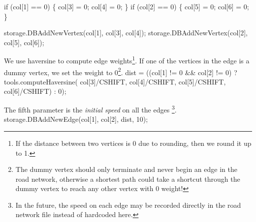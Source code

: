 \documentclass{article}
\def\nwendcode{\endtrivlist \endgroup}      %
\let\nwdocspar=\par
\begin{document}
if (col[1] == 0) \{
  col[3] = 0;
  col[4] = 0;
\}
if (col[2] == 0) \{
  col[5] = 0;
  col[6] = 0;
\}
\nwendcode{}\nwdocspar
\nwenddocs{}\endmoddef{}
storage.DBAddNewVertex(col[1], col[3], col[4]);
storage.DBAddNewVertex(col[2], col[5], col[6]);
\nwendcode{}\nwdocspar
We use haversine to compute edge weights\footnote{If the distance between two
vertices is 0 due to rounding, then we round it up to 1.}.  If one of the
vertices in the edge is a dummy vertex, we set the weight to 0\footnote{The
dummy vertex should only terminate and never begin an edge in the road network,
otherwise a shortest path could take a shortcut through the dummy vertex to
reach any other vertex with 0 weight!}.
\nwenddocs{}\endmoddef{}
dist = ((col[1] != 0 && col[2] != 0)
  ? tools.computeHaversine(
        col[3]/CSHIFT, col[4]/CSHIFT,
        col[5]/CSHIFT, col[6]/CSHIFT) : 0);
\nwendcode{}\nwdocspar
The fifth parameter is the \textit{initial speed} on all the edges \footnote{In
the future, the speed on each edge may be recorded directly in the road network
file instead of hardcoded here.}.
\nwenddocs{}\endmoddef{}
storage.DBAddNewEdge(col[1], col[2], dist, 10);
\nwendcode{}\nwdocspar
\end{document}
